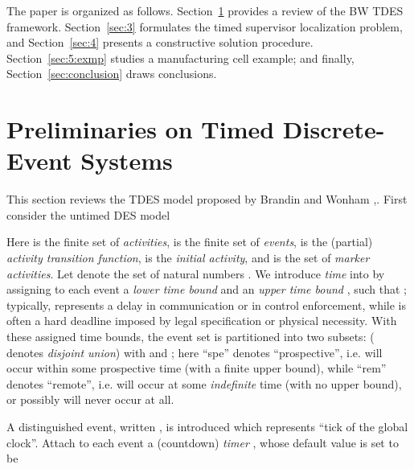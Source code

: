 \documentclass[twocolumn]{autart}
\begin{document}
The paper is organized as follows. Section~\ref{sec:2} provides a
review of the BW TDES framework. Section~\ref{sec:3}
formulates the timed supervisor localization problem, and
Section~\ref{sec:4} presents a constructive solution procedure.
Section~\ref{sec:5:exmp} studies a manufacturing cell example; and finally,
Section~\ref{sec:conclusion} draws conclusions.


\section{Preliminaries on Timed Discrete-Event Systems} \label{sec:2}

This section reviews the TDES model proposed by Brandin and Wonham
\cite{BrandinWonham:94},\cite[Chapter~9]{Wonham:2011a}. First
consider the untimed DES model

Here  is the finite set of {\it activities},  is
the finite set of {\it events},  is the (partial) {\it activity transition function},  is the {\it initial activity}, and  is the set
of {\it marker activities}. Let  denote the set of
natural numbers . We introduce \emph{time} into  by assigning to each event  a
{\it lower time bound}  and an {\it upper
time bound} , such that
; typically,  represents a delay
in communication or in control enforcement, while  is
often a hard deadline imposed by legal specification or physical
necessity. With these assigned time bounds, the event set
 is partitioned into two subsets:  ( denotes
\emph{disjoint union}) with  and ; here ``spe''
denotes ``prospective'', i.e.  will occur within some
prospective time (with a finite upper bound), while ``rem'' denotes
``remote'', i.e.  will occur at some \emph{indefinite} time
(with no upper bound), or possibly will never occur at all.

A distinguished event, written , is introduced which
represents ``tick of the global clock''. Attach to each event
 a (countdown) {\it timer} , whose default value  is set to be
\end{document}
